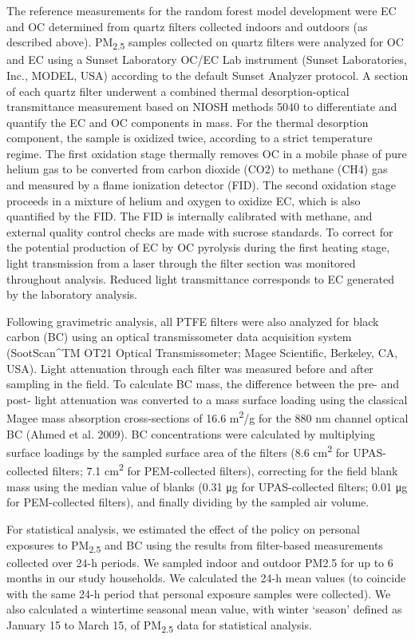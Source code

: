 \documentclass[
  letterpaper,
  DIV=11,
  numbers=noendperiod]{scrartcl}
\begin{document}
The reference measurements for the random forest model development were
EC and OC determined from quartz filters collected indoors and outdoors
(as described above). PM\textsubscript{2.5} samples collected on quartz
filters were analyzed for OC and EC using a Sunset Laboratory OC/EC Lab
instrument (Sunset Laboratories, Inc., MODEL, USA) according to the
default Sunset Analyzer protocol. A section of each quartz filter
underwent a combined thermal desorption-optical transmittance
measurement based on NIOSH methods 5040 to differentiate and quantify
the EC and OC components in mass. For the thermal desorption component,
the sample is oxidized twice, according to a strict temperature regime.
The first oxidation stage thermally removes OC in a mobile phase of pure
helium gas to be converted from carbon dioxide (CO2) to methane (CH4)
gas and measured by a flame ionization detector (FID). The second
oxidation stage proceeds in a mixture of helium and oxygen to oxidize
EC, which is also quantified by the FID. The FID is internally
calibrated with methane, and external quality control checks are made
with sucrose standards. To correct for the potential production of EC by
OC pyrolysis during the first heating stage, light transmission from a
laser through the filter section was monitored throughout analysis.
Reduced light transmittance corresponds to EC generated by the
laboratory analysis.

Following gravimetric analysis, all PTFE filters were also analyzed for
black carbon (BC) using an optical transmissometer data acquisition
system (SootScan\^{}TM OT21 Optical Transmissometer; Magee Scientific,
Berkeley, CA, USA). Light attenuation through each filter was measured
before and after sampling in the field. To calculate BC mass, the
difference between the pre- and post- light attenuation was converted to
a mass surface loading using the classical Magee mass absorption
cross-sections of 16.6 m\textsuperscript{2}/g for the 880 nm channel
optical BC (Ahmed et al. 2009). BC concentrations were calculated by
multiplying surface loadings by the sampled surface area of the filters
(8.6 cm\textsuperscript{2} for UPAS-collected filters; 7.1
cm\textsuperscript{2} for PEM-collected filters), correcting for the
field blank mass using the median value of blanks (0.31 μg for
UPAS-collected filters; 0.01 μg for PEM-collected filters), and finally
dividing by the sampled air volume.

For statistical analysis, we estimated the effect of the policy on
personal exposures to PM\textsubscript{2.5} and BC using the results
from filter-based measurements collected over 24-h periods. We sampled
indoor and outdoor PM2.5 for up to 6 months in our study households. We
calculated the 24-h mean values (to coincide with the same 24-h period
that personal exposure samples were collected). We also calculated a
wintertime seasonal mean value, with winter `season' defined as January
15 to March 15, of PM\textsubscript{2.5} data for 
statistical analysis.
\end{document}
